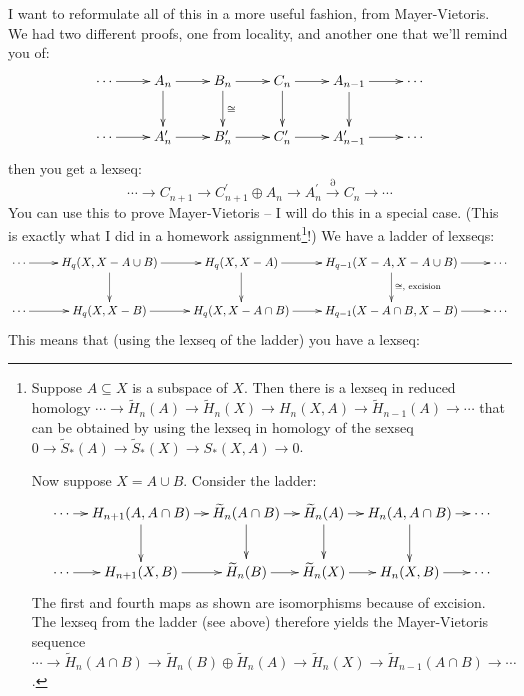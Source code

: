 I want to reformulate all of this in a more useful fashion, from Mayer-Vietoris. We had two different proofs, one from locality, and another one that we'll remind you of:
\begin{equation*}
\xymatrix{
	\cdots\ar[r] & A_n\ar[r]\ar[d] & B_n\ar[r]\ar[d]^\cong & C_n\ar[r]\ar[d] & A_{n-1}\ar[r]\ar[d] & \cdots\\
	\cdots\ar[r] & A_n^\prime\ar[r] & B_n^\prime\ar[r] & C^\prime_n\ar[r] & A^\prime_{n-1}\ar[r] & \cdots
}
\end{equation*}
then you get a lexseq:
\begin{equation*}
\cdots\to C_{n+1}\to C^\prime_{n+1}\oplus A_n\to A^\prime_n\xrightarrow{\partial} C_n\to\cdots
\end{equation*}
You can use this to prove Mayer-Vietoris -- I will do this in a special case. (This is exactly what I did in a homework assignment\footnote{Suppose $A\subseteq X$ is a subspace of $X$. Then there is a lexseq in reduced homology $\cdots\to \widetilde{ H}_n(A)\to \widetilde{ H}_n(X)\to H_n(X,A)\to\widetilde{ H}_{n-1}(A)\to\cdots$ that can be obtained by using the lexseq in homology of the sexseq $0\to\widetilde{S}_\ast(A)\to\widetilde{S}_\ast(X)\to S_\ast(X,A)\to 0$.

Now suppose $X=A\cup B$. Consider the ladder:
\begin{equation*}
\xymatrix@C=10pt{\cdots\ar[r] & H_{n+1}(A,A\cap B)\ar[r]\ar[d] & \widetilde{ H}_n(A\cap B)\ar[r]\ar[d] & \widetilde{ H}_n(A)\ar[r]\ar[d] & H_n(A,A\cap B)\ar[r]\ar[d] & \cdots\\
\cdots\ar[r] & H_{n+1}(X,B)\ar[r] & \widetilde{ H}_n(B)\ar[r] & \widetilde{ H}_n(X)\ar[r] & H_n(X,B)\ar[r] & \cdots}
\end{equation*}
The first and fourth maps as shown are isomorphisms because of excision. The lexseq from the ladder (see above) therefore yields the Mayer-Vietoris sequence $\cdots\to \widetilde{ H}_n(A\cap B)\to \widetilde{ H}_n(B)\oplus \widetilde{ H}_n(A)\to \widetilde{ H}_n(X)\to \widetilde{ H}_{n-1}(A\cap B)\to\cdots$.}!) We have a ladder of lexseqs:
\begin{equation*}
\xymatrix{
	\cdots\ar[r] & H_q(X,X-A\cup B)\ar[r]\ar[d] & H_q(X,X-A)\ar[r]\ar[d] & H_{q-1}(X-A,X-A\cup B)\ar[r]\ar[d]^{\cong,\text{ excision}} & \cdots\\
	\cdots\ar[r] & H_q(X,X-B)\ar[r] & H_q(X,X-A\cap B)\ar[r] & H_{q-1}(X-A\cap B,X-B)\ar[r] & \cdots
}
\end{equation*}
This means that (using the lexseq of the ladder) you have a lexseq:
